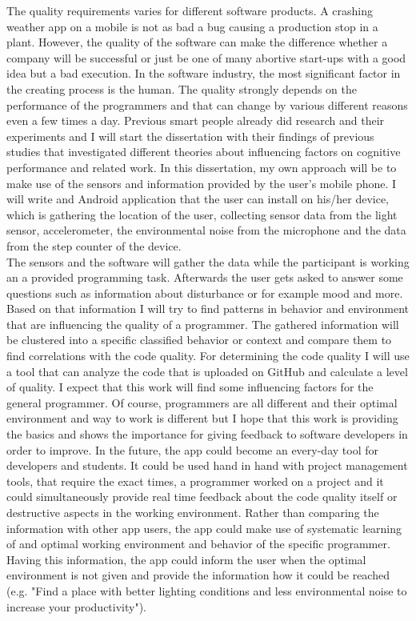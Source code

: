 \begin{flushleft}
The quality requirements varies for different software products. A crashing weather app on a mobile is not as bad a bug causing a production stop in a plant. 
However, the quality of the software can make the difference whether a company will be successful or just be one of many abortive start-ups with a good idea but a bad execution.
\bigbreak
In the software industry, the most significant factor in the creating process is the human. The quality strongly depends on the performance of the programmers and that can change by various different reasons even a few times a day. Previous smart people already did research and their experiments and I will start the dissertation with their findings of previous studies that investigated different theories about influencing factors on cognitive performance and related work.
\bigbreak
In this dissertation, my own approach will be to make use of the sensors and information provided by the user's mobile phone. I will write and Android application that the user can install on his/her device, which is gathering the location of the user, collecting sensor data from the light sensor, accelerometer, the environmental noise from the microphone and the data from the step counter of the device. \\
The sensors and the software will gather the data while the participant is working an a provided programming task. Afterwards the user gets asked to answer some questions such as information about disturbance or for example mood and more. \\
Based on that information I will try to find patterns in behavior and environment that are influencing the quality of a programmer. The gathered information will be clustered into a specific classified behavior or context and compare them to find correlations with the code quality.
\bigbreak
For determining the code quality I will use a tool that can analyze the code that is uploaded on GitHub and calculate a level of quality.
\bigbreak
I expect that this work will find some influencing factors for the general programmer. Of course, programmers are all different and their optimal environment and way to work is different but I hope that this work is providing the basics and shows the importance for giving feedback to software developers in order to improve.
\bigbreak
In the future, the app could become an every-day tool for developers and students. It could be used hand in hand with project management tools, that require the exact times, a programmer worked on a project and it could simultaneously provide real time feedback about the code quality itself or destructive aspects in the working environment. Rather than comparing the information with other app users, the app could make use of systematic learning of and optimal working environment and behavior of the specific programmer. Having this information, the app could inform the user when the optimal environment is not given and provide the information how it could be reached (e.g. "Find a place with better lighting conditions and less environmental noise to increase your productivity"). 

\end{flushleft}


